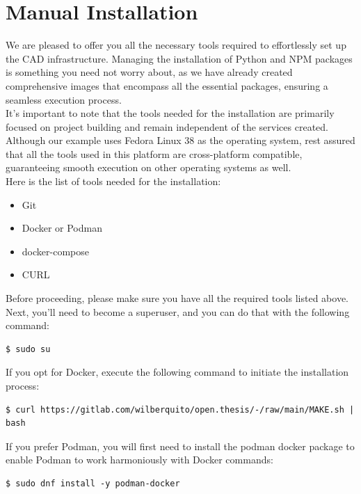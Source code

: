 \section{Manual Installation}
\label{appendix:appendix_a}

We are pleased to offer you all the necessary tools required to effortlessly set up the CAD infrastructure.
Managing the installation of Python and NPM packages is something you need not worry about,
as we have already created comprehensive images that encompass all the essential packages,
ensuring a seamless execution process. \\

It's important to note that the tools needed for the installation are
primarily focused on project building and remain independent of the services created.
Although our example uses Fedora Linux 38 as the operating system,
rest assured that all the tools used in this platform are cross-platform compatible,
guaranteeing smooth execution on other operating systems as well. \\


Here is the list of tools needed for the installation:

\begin{itemize}
  \item Git
  \item Docker or Podman
  \item docker-compose
  \item CURL
\end{itemize}

Before proceeding, please make sure you have all the required tools listed above.
Next, you'll need to become a superuser, and you can do that with the following command:

\begin{Verbatim}[fontsize=\small]
$ sudo su
\end{Verbatim}

If you opt for Docker, execute the following command to initiate the installation process:

\begin{Verbatim}[fontsize=\small]
$ curl https://gitlab.com/wilberquito/open.thesis/-/raw/main/MAKE.sh | bash
\end{Verbatim}

If you prefer Podman,
you will first need to install the podman docker package to enable Podman to work harmoniously with Docker commands:

\begin{Verbatim}[fontsize=\small]
$ sudo dnf install -y podman-docker
\end{Verbatim}

